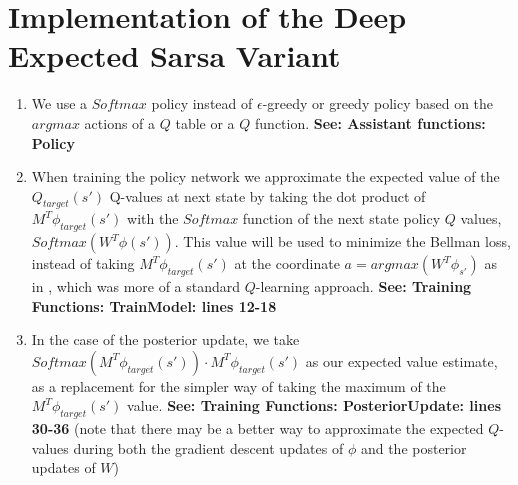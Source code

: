 \documentclass{article}
\begin{document}
\section{Implementation of the Deep Expected Sarsa Variant}
\begin{enumerate}
    \item We use a $Softmax$ policy instead of $\epsilon$-greedy or greedy policy based on the $argmax$ actions of a $Q$ table or a $Q$ function. \newline\newline \textbf{See: Assistant functions: Policy}
    \item When training the policy network we approximate the expected value of the $Q_{target}(s')$ Q-values at next state by taking the dot product of $M^T\phi_{target}(s')$ with the $Softmax$ function of the next state policy $Q$ values, $Softmax(W^T\phi(s'))$. This value will be used to minimize the Bellman loss, instead of taking $M^T\phi_{target}(s')$ at the coordinate $a = argmax(W^T\phi_{s'})$ as in \cite{EEtBDQN}, which was more of a standard $Q$-learning approach.\newline\newline
    \textbf{See: Training Functions: TrainModel: lines 12-18}
    \item In the case of the posterior update, we take $Softmax(M^T\phi_{target}(s')) \cdot M^T\phi_{target}(s')$ as our 
    expected value estimate, as a replacement for the simpler way of taking the maximum of the $M^T\phi_{target}(s')$ value.\newline\newline
    \textbf{See: Training Functions: PosteriorUpdate: lines 30-36} \newline\newline
    (note that there may be a better way to approximate the expected $Q$-values during both the gradient descent updates of $\phi$ and the posterior updates of $W$)
\end{enumerate}

\clearpage
\end{document}
